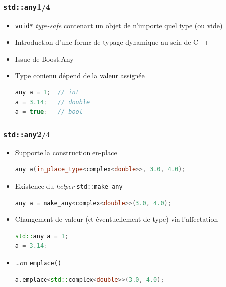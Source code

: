 \documentclass[C++.tex]{subfiles}
\begin{document}
\begin{frame}[fragile]
	\frametitle{\lstinline|std::any|\titlehfill{}1/4}
	\begin{itemize}
		\item \lstinline|void*| \textit{type-safe} contenant un objet de n'importe quel type (ou vide)
		\item Introduction d'une forme de typage dynamique au sein de C++


		\item Issue de Boost.Any
		\item Type contenu dépend de la valeur assignée

	\begin{lstlisting}[language=C++]
any a = 1;  // int
a = 3.14;   // double
a = true;   // bool\end{lstlisting}
	\end{itemize}
\end{frame}

\begin{frame}[fragile]
	\frametitle{\lstinline|std::any|\titlehfill{}2/4}
	\begin{itemize}
		\item Supporte la construction \og en-place\fg{}

			\begin{lstlisting}[language=C++]
any a(in_place_type<complex<double>>, 3.0, 4.0);\end{lstlisting}

		\item Existence du \textit{helper} \lstinline|std::make_any|

			\begin{lstlisting}[language=C++]
any a = make_any<complex<double>>(3.0, 4.0);\end{lstlisting}

		\item Changement de valeur (et éventuellement de type) via l'affectation

			\begin{lstlisting}[language=C++]
std::any a = 1;
a = 3.14;
\end{lstlisting}
	
		\item \ldots ou \lstinline|emplace()|
			\begin{lstlisting}[language=C++]
a.emplace<std::complex<double>>(3.0, 4.0);
\end{lstlisting}

	\end{itemize}
\end{frame}
\end{document}

